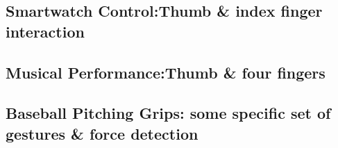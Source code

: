 \documentclass{sigchi}
\begin{document}
\subsection{Smartwatch Control:Thumb \& index finger interaction}
    
\subsection{Musical Performance:Thumb \& four fingers}
    
\subsection{Baseball Pitching Grips: some specific set of gestures \& force detection}
    


\end{document}
